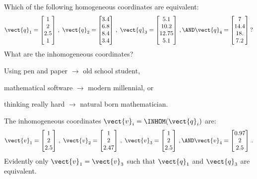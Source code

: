 \documentclass[oneandhalfcolumn]{coursenotes-handout}
\begin{document}
\begin{exercise}\label{exc:homogeneous-coords}
  Which of the following homogeneous coordinates are equivalent:
  \begin{align}
      \vect{q}_1 = \begin{bmatrix} 1    \\  2   \\  2.5  \\  1 \end{bmatrix} \,, \;
      \vect{q}_2 = \begin{bmatrix} 3.4  \\  6.8 \\  8.4  \\  3.4 \end{bmatrix} \,, \;
      \vect{q}_3 = \begin{bmatrix} 5.1  \\ 10.2 \\ 12.75 \\  5.1 \end{bmatrix} \,, \AND
      \vect{q}_4 = \begin{bmatrix} 7    \\ 14.4 \\ 18.   \\  7.2 \end{bmatrix} \,?
  \end{align}
  What are the inhomogeneous coordinates?

  \begin{scorecard}
    \item Using pen and paper \( \rightarrow \) old school student,
    \item mathematical software \( \rightarrow \) modern millennial, or
    \item thinking really hard \( \rightarrow \) natural born mathematician.
  \end{scorecard}

\solution
  The inhomogeneous coordinates \(\vect{v}_i = \INHOM(\vect{q}_i)\) are:
  \begin{align}
      \vect{v}_1 = \begin{bmatrix} 1    \\  2   \\  2.5  \end{bmatrix} \,, \;
      \vect{v}_2 = \begin{bmatrix} 1    \\  2   \\  2.47 \end{bmatrix} \,, \;
      \vect{v}_3 = \begin{bmatrix} 1    \\  2   \\  2.5  \end{bmatrix} \,, \AND
      \vect{v}_4 = \begin{bmatrix} 0.97 \\  2   \\  2.5  \end{bmatrix} \,.
  \end{align}
  Evidently only \(\vect{v}_1 = \vect{v}_3\) such that \(\vect{q}_1\) and \(\vect{q}_3\) are equivalent.


\end{exercise}
\end{document}
